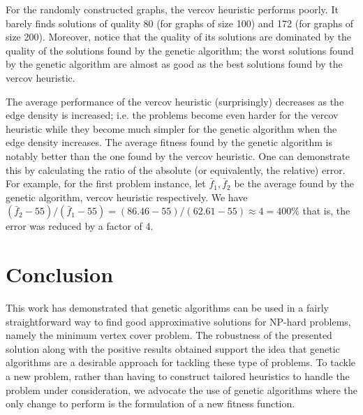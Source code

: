 \documentclass[12pt]{article}
\begin{document}
For the randomly constructed graphs, the vercov heuristic
performs poorly.
It barely finds solutions of quality 80 (for graphs of size 100)
and 172 (for graphs of size 200).
Moreover, notice that the quality of its solutions are dominated
by the quality of the solutions found by the genetic algorithm;
the worst solutions found by the genetic algorithm are almost as
good as the best solutions found by the vercov heuristic.

The average performance of the vercov heuristic (surprisingly)
decreases as the edge density is increased;
i.e. the problems become even harder for the vercov heuristic
while they become much simpler for the genetic algorithm when
the edge density increases.
The average fitness found by the genetic algorithm is notably
better than the one found by the vercov heuristic.
One can demonstrate this by calculating
the ratio of the absolute (or equivalently, the relative) error.
For example, for the first problem instance,
let $\bar{f}_1, \bar{f}_2$ be the average found by
the genetic algorithm, vercov heuristic respectively.
We have $ (\bar{f}_2 - 55) / (\bar{f}_1 - 55) = (86.46 - 55)/(62.61 - 55) \approx 4 = 400\%$
that is, the error was reduced by a factor of 4.


\section{Conclusion}
\label{sec:conc}
This work has demonstrated that genetic algorithms can
be used in a fairly straightforward way to find good
approximative solutions for NP-hard problems, namely
the minimum vertex cover problem.
The robustness of the presented solution along with
the positive results obtained support the idea
that genetic algorithms are a desirable approach for tackling
these type of problems.
To tackle a new problem, rather than having to construct
tailored heuristics to handle the problem under consideration,
we advocate the use of genetic algorithms where the
only change to perform is the formulation of a new fitness
function.

\pagebreak


%
%
\printbibliography

\end{document}

